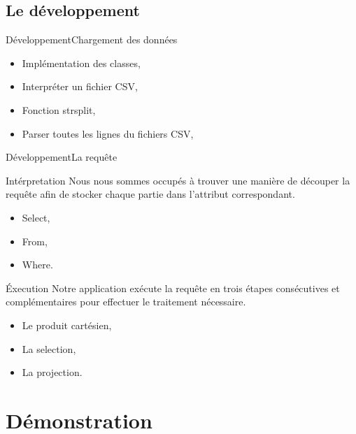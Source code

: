 \documentclass[10pt,handout]{beamer}
\begin{document}
\subsection{Le développement}

\begin{frame}{Développement}{Chargement des données}
  \begin{itemize}
    \item Implémentation des classes,
    \item Interpréter un fichier CSV,
    \item Fonction strsplit,
    \item Parser toutes les lignes du fichiers CSV,
  \end{itemize}
\end{frame}

\begin{frame}{Développement}{La requête}
  \begin{block}{Intérpretation}
    Nous nous sommes occupés à trouver une manière de découper la requête afin de stocker chaque partie dans l’attribut correspondant.
    \begin{itemize}
      \item Select,
      \item From,
      \item Where.
    \end{itemize}
  \end{block}
  
  \begin{block}{Éxecution}
    Notre application exécute la requête en trois étapes consécutives et complémentaires pour effectuer le traitement nécessaire.
    \begin{itemize}
      \item Le produit cartésien,
      \item La selection,
      \item La projection.
    \end{itemize}
  \end{block}
\end{frame}


\section{Démonstration}

\end{document}
